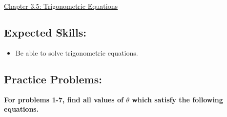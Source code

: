 \documentclass[12pt]{article}
\begin{document}
\begin{center}
\underline{\LARGE{Chapter 3.5: Trigonometric Equations}}
\end{center}

\subsection*{Expected Skills:}

\begin{itemize}

\item Be able to solve trigonometric equations.

\end{itemize}

\subsection*{Practice Problems: }

{\bf For problems 1-7, find all values of $\theta$ which satisfy the following equations.}
\end{document}
